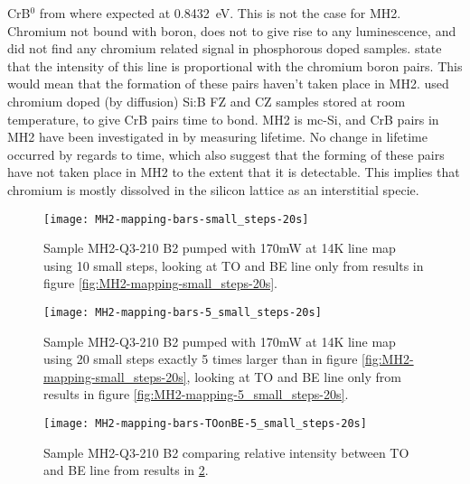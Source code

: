 CrB$^0$ from \cite{conzelmann82} where expected at 0.8432~eV. This is not the case for MH2. Chromium not bound with boron, does not to give rise to any luminescence, and \cite{conzelmann82} did not find any chromium related signal in phosphorous doped samples. \cite{conzelmann82} state that the intensity of this line is proportional with the chromium boron pairs. This would mean that the formation of these pairs haven't taken place in MH2. \cite{conzelmann82} used chromium doped (by diffusion) Si:B FZ and CZ samples stored at room temperature, to give CrB pairs time to bond. MH2 is mc-Si, and CrB pairs in MH2 have been investigated in \cite{hystad09} by measuring lifetime. No change in lifetime occurred by regards to time, which also suggest that the forming of these pairs have not taken place in MH2 to the extent that it is detectable. This implies that chromium is mostly dissolved in the silicon lattice as an interstitial specie.









\begin{figure}[H]
\centering
\texttt{[image: MH2-mapping-bars-small\_steps-20s]}
\caption[MH2-Q3-210 line mapping]{Sample MH2-Q3-210 B2 pumped with 170mW at 14K line map using 10 small steps, looking at TO and BE line only from results in figure \ref{fig:MH2-mapping-small_steps-20s}.}
\label{fig:MH2-mapping-bars-small_steps-20s}%
\end{figure}

\begin{figure}[H]
\centering
\texttt{[image: MH2-mapping-bars-5\_small\_steps-20s]}
\caption[MH2-Q3-210 line mapping]{Sample MH2-Q3-210 B2 pumped with 170mW at 14K line map using 20 small steps exactly 5 times larger than in figure \ref{fig:MH2-mapping-small_steps-20s}, looking at TO and BE line only from results in figure \ref{fig:MH2-mapping-5_small_steps-20s}.}
\label{fig:MH2-mapping-bars-5_small_steps-20s}%
\end{figure}


\begin{figure}[H]
\centering
\texttt{[image: MH2-mapping-bars-TOonBE-5\_small\_steps-20s]}
\caption[MH2-Q3-210 line mapping]{Sample MH2-Q3-210 B2 comparing relative intensity between TO and BE line from results in \ref{fig:MH2-mapping-bars-5_small_steps-20s}.}
\label{fig:MH2-mapping-bars-TOonBE-5_small_steps-20s}%
\end{figure}


